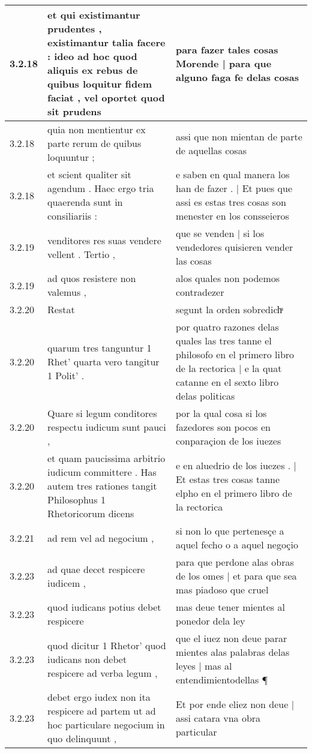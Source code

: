 \begin{tabular}{|p{1cm}|p{6.5cm}|p{6.5cm}|}
3.2.18 & et qui existimantur prudentes , existimantur talia facere : ideo ad hoc quod aliquis ex rebus de quibus loquitur fidem faciat , vel oportet quod sit prudens & para fazer tales cosas Morende | para que alguno faga fe delas cosas \\\hline
3.2.18 & quia non mentientur ex parte rerum de quibus loquuntur ; & assi que non mientan de parte de aquellas cosas \\\hline
3.2.18 & et scient qualiter sit agendum . Haec ergo tria quaerenda sunt in consiliariis : & e saben en qual manera los han de fazer . | Et pues que assi es estas tres cosas son menester en los consseieros \\\hline
3.2.19 & venditores res suas vendere vellent . Tertio , & que se venden | si los vendedores quisieren vender las cosas \\\hline
3.2.19 & ad quos resistere non valemus , & alos quales non podemos contradezer \\\hline
3.2.20 & Restat & segunt la orden sobredichͣ \\\hline
3.2.20 & quarum tres tanguntur 1 Rhet’ quarta vero tangitur 1 Polit’ . & por quatro razones delas quales las tres tanne el philosofo en el primero libro de la rectorica | e la quat catanne en el sexto libro delas politicas \\\hline
3.2.20 & Quare si legum conditores respectu iudicum sunt pauci , & por la qual cosa si los fazedores son pocos en conparaçion de los iuezes \\\hline
3.2.20 & et quam paucissima arbitrio iudicum committere . Has autem tres rationes tangit Philosophus 1 Rhetoricorum dicens & e en aluedrio de los iuezes . | Et estas tres cosas tanne elpho en el primero libro de la rectorica \\\hline
3.2.21 & ad rem vel ad negocium , & si non lo que pertenesçe a aquel fecho o a aquel negoçio \\\hline
3.2.23 & ad quae decet respicere iudicem , & para que perdone alas obras de los omes | et para que sea mas piadoso que cruel \\\hline
3.2.23 & quod iudicans potius debet respicere & mas deue tener mientes al ponedor dela ley \\\hline
3.2.23 & quod dicitur 1 Rhetor’ quod iudicans non debet respicere ad verba legum , & que el iuez non deue parar mientes alas palabras delas leyes | mas al entendimientodellas ¶ \\\hline
3.2.23 & debet ergo iudex non ita respicere ad partem ut ad hoc particulare negocium in quo delinquunt , & Et por ende eliez non deue | assi catara vna obra particular \\\hline

\end{tabular}

